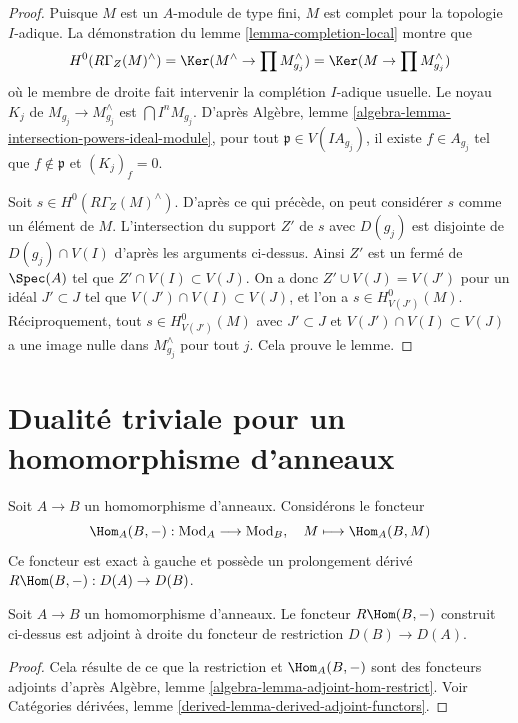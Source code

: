 \begin{proof}
Puisque $M$ est un $A$-module de type fini, $M$
est complet pour la topologie $I$-adique.
La démonstration du lemme \ref{lemma-completion-local} montre que
$$
H^0(R\Gamma_Z(M)^\wedge) =
\Ker(M^\wedge \to \prod M_{g_j}^\wedge) =
\Ker(M \to \prod M_{g_j}^\wedge)
$$
où le membre de droite fait intervenir la complétion $I$-adique usuelle.
Le noyau $K_j$ de $M_{g_j} \to M_{g_j}^\wedge$ est $\bigcap I^n M_{g_j}$.
D'après Algèbre, lemme \ref{algebra-lemma-intersection-powers-ideal-module},
pour tout $\mathfrak p \in V(IA_{g_j})$, il existe $f \in A_{g_j}$ tel que $f \not \in \mathfrak p$ et $(K_j)_f = 0$.

\medskip\noindent
Soit $s \in H^0(R\Gamma_Z(M)^\wedge)$.
D'après ce qui précède, on peut considérer $s$ comme un élément de $M$.
L'intersection du support $Z'$ de $s$ avec $D(g_j)$
est disjointe de $D(g_j) \cap V(I)$ d'après les arguments ci-dessus.
Ainsi $Z'$ est un fermé de $\Spec(A)$ tel que $Z' \cap V(I) \subset V(J)$.
On a donc $Z' \cup V(J) = V(J')$ pour un idéal $J' \subset J$ tel que $V(J') \cap V(I) \subset V(J)$,
et l'on a $s \in H^0_{V(J')}(M)$.
Réciproquement, tout $s \in H^0_{V(J')}(M)$ avec $J' \subset J$ et $V(J') \cap V(I) \subset V(J)$
a une image nulle dans $M_{g_j}^\wedge$ pour tout $j$.
Cela prouve le lemme.
\end{proof}









\section{Dualité triviale pour un homomorphisme d'anneaux}
\label{section-trivial}

\noindent
Soit $A \to B$ un homomorphisme d'anneaux. Considérons le foncteur
$$
\Hom_A(B, -) : \text{Mod}_A \longrightarrow \text{Mod}_B,\quad
M \longmapsto \Hom_A(B, M)
$$
Ce foncteur est exact à gauche et possède un prolongement dérivé
$R\Hom(B, -) : D(A) \to D(B)$.

\begin{lemma}
\label{lemma-right-adjoint}
Soit $A \to B$ un homomorphisme d'anneaux. Le foncteur $R\Hom(B, -)$
construit ci-dessus est adjoint à droite du foncteur de restriction
$D(B) \to D(A)$.
\end{lemma}

\begin{proof}
Cela résulte de ce que la restriction et $\Hom_A(B, -)$ sont des foncteurs adjoints
d'après Algèbre, lemme \ref{algebra-lemma-adjoint-hom-restrict}.
Voir Catégories dérivées, lemme \ref{derived-lemma-derived-adjoint-functors}.
\end{proof}

